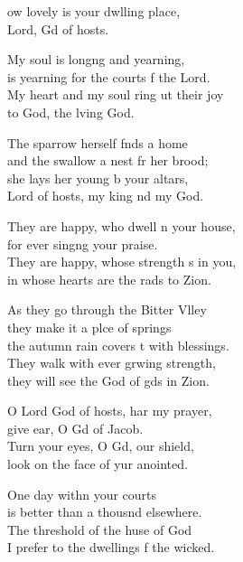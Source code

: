 \settowidth{\versewidth}{They are happy, whose strength is in you, *}
\begin{psalmverse}%
  \begin{patverse}
ow lovely is your dwlling place,\Med\\
Lord, Gd of hosts.

My soul is long\pointup{\i}ng and yearning,\Med\\
is yearning for the courts f the Lord.\\
My heart and my soul ring ut their joy\Med\\
to God, the l\pointup{\i}ving God.

The sparrow herself f\pointup{\i}nds a home\Med\\
and the swallow a nest fr her brood;\\
she lays her young b your altars,\Med\\
Lord of hosts, my king nd my God.

They are happy, who dwell \pointup{\i}n your house,\Med\\
for ever sing\pointup{\i}ng your praise.\\
They are happy, whose strength \pointup{\i}s in you,\Med\\
in whose hearts are the rads to Zion.

As they go through the Bitter Vlley\Flex\\
they make it a plce of springs\Med\\
the autumn rain covers \pointup{\i}t with blessings.\\
They walk with ever grwing strength,\Med\\
they will see the God of gds in Zion.

O Lord God of hosts, har my prayer,\Med\\
give ear, O Gd of Jacob.\\
Turn your eyes, O Gd, our shield,\Med\\
look on the face of yur anointed.

One day with\pointup{\i}n your courts\Med\\
is better than a thousnd elsewhere.\\
The threshold of the huse of God\Med\\
I prefer to the dwellings f the wicked.


\end{patverse}
\end{psalmverse}
